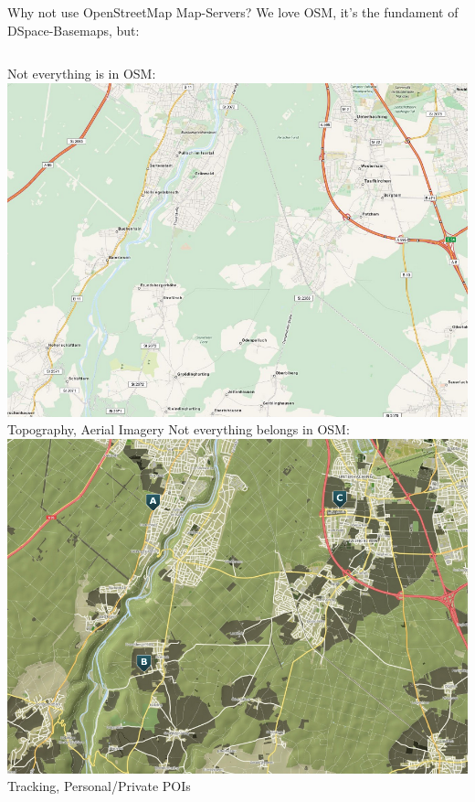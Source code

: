 \documentclass{beamer}
\begin{document}
\begin{frame}{Why not use OpenStreetMap Map-Servers?}
 {\small We love OSM, it's the fundament of DSpace-Basemaps, but: }
 \linebreak
 \begin{columns}
   {\small Not everything is in OSM:\vspace{1em}}
   \includegraphics[scale=0.169]{images/map_render_osm}
   \linebreak
   {\small Topography, Aerial Imagery}
   {\small Not everything belongs in OSM:\vspace{1em}}
   \includegraphics[scale=0.169]{images/map_render_dspace}
   \linebreak
   {\small Tracking, Personal/Private POIs}
 \end{columns}
\end{frame}
\end{document}

